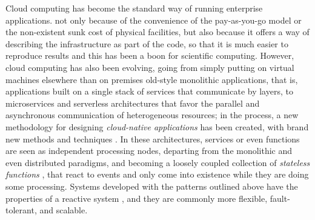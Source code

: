 \documentclass[review]{elsarticle}
\begin{document}
Cloud computing has become the standard way of running
enterprise applications.  not only because of the convenience of the
pay-as-you-go model or the non-existent sunk cost of physical facilities, but also because
it offers a way of describing the infrastructure as part of the code, so that it
is much easier to reproduce results and this has been a boon for scientific
computing.  However,  cloud computing has also been evolving, going from simply
putting on virtual machines elsewhere than on premises old-style monolithic applications, that is, applications
built on a single stack of services that communicate by layers, to microservices
\cite{microservices} and serverless architectures \cite{varghese2018next,Varghese2018849} 
that favor the parallel and asynchronous communication of
heterogeneous resources; in the process, a new methodology for designing 
{\em cloud-native applications} has been created, with brand new methods and
techniques \cite{Baldini2016287}. 
In these architectures, services or even
functions are seen as independent processing nodes, departing from the monolithic
and even distributed paradigms, and becoming a loosely coupled collection of {\em
stateless functions} \cite{malawski2017serverless}, that react to events and
only come into existence while they are doing some processing.
Systems developed with the patterns outlined above have the
properties of a reactive system \cite{boner2014reactive}, and they are commonly
more flexible, fault-tolerant, and scalable. %
\end{document}
